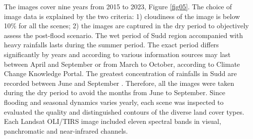 \documentclass[analytics,article,submit,pdftex,moreauthors]{Definitions/mdpi}
\begin{document}
The images cover nine years from 2015 to 2023, Figure \ref{fig05}. The choice of image data is explained by the two criteria: 1) cloudiness of the image is below 10\% for all the scenes; 2) the images are captured in the dry period to objectively assess the post-flood scenario. The wet period of Sudd region accompanied with heavy rainfalls lasts during the summer period. The exact period differs significantly by years and according to various information sources may last between April and September \cite{MartinBurgess} or from March to October, according to Climate Change Knowledge Portal. The greatest concentration of rainfalls in Sudd are recorded between June and September \cite{Climatic}. Therefore, all the images were taken during the dry period to avoid the months from June to September. Since flooding and seasonal dynamics varies yearly, each scene was inspected to evaluated the quality and distinguished contours of the diverse land cover types. Each Landsat OLI/TIRS image included eleven spectral bands in visual, panchromatic and near-infrared channels. 
\end{document}
